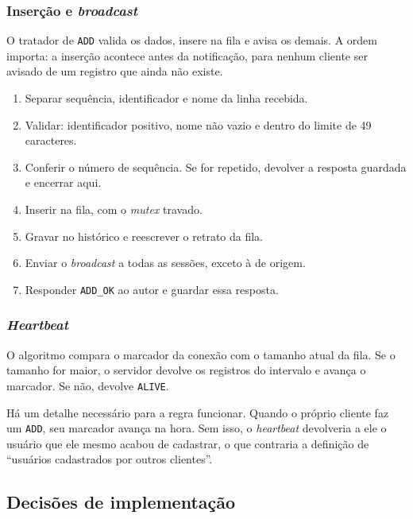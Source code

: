 \documentclass[12pt,a4paper]{article}
\begin{document}
\subsubsection*{Inserção e \textit{broadcast}}

O tratador de \texttt{ADD} valida os dados, insere na fila e avisa os demais. A
ordem importa: a inserção acontece antes da notificação, para nenhum cliente ser
avisado de um registro que ainda não existe.

\begin{enumerate}
  \item Separar sequência, identificador e nome da linha recebida.
  \item Validar: identificador positivo, nome não vazio e dentro do limite de
        49 caracteres.
  \item Conferir o número de sequência. Se for repetido, devolver a resposta
        guardada e encerrar aqui.
  \item Inserir na fila, com o \textit{mutex} travado.
  \item Gravar no histórico e reescrever o retrato da fila.
  \item Enviar o \textit{broadcast} a todas as sessões, exceto à de origem.
  \item Responder \texttt{ADD\_OK} ao autor e guardar essa resposta.
\end{enumerate}

\subsubsection*{\textit{Heartbeat}}

O algoritmo compara o marcador da conexão com o tamanho atual da fila. Se o
tamanho for maior, o servidor devolve os registros do intervalo e avança o
marcador. Se não, devolve \texttt{ALIVE}.

Há um detalhe necessário para a regra funcionar. Quando o próprio cliente faz um
\texttt{ADD}, seu marcador avança na hora. Sem isso, o \textit{heartbeat}
devolveria a ele o usuário que ele mesmo acabou de cadastrar, o que contraria a
definição de ``usuários cadastrados por outros clientes''.

\subsection{Decisões de implementação}
\end{document}
